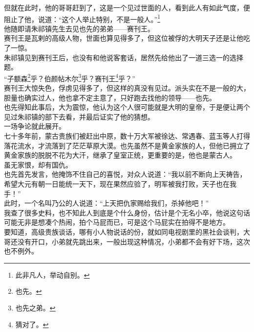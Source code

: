 \begin{multicols}{\theparacolNo}
但就在此时，他的哥哥赶到了，这是一个见过世面的人，看到此人有如此气度，便阻止了他，说道：“这个人举止特别，不是一般人。”\footnote{此非凡人，举动自别。}\\

他随即请朱祁镇先生去见也先的弟弟——赛刊王。\\

赛刊王是瓦剌的高级人物，世面也算见得多了，但这位被俘的大明天子还是让他吃了一惊。\\

朱祁镇见到赛刊王后，也没有和他说客套话，居然先给他出了一道三选一的选择题。\\

“子额森\footnote{也先。}乎？伯颜帖木尔\footnote{也先之弟。}乎？赛刊王\footnote{猜对了。}乎？”\\

赛刊王大惊失色，俘虏见得多了，但这样的真没有见过。派头实在不是一般的大，胆量也确实过人，他也拿不定主意了，只好跑去找他的领导——也先。\\

也先得知此事后，大为震惊，他认为这个人很可能就是大明的皇帝，于是便让两个见过朱祁镇的部下去看，并最后证实了他的猜想。\\

一场争论就此展开。\\

七十多年前，蒙古贵族们被赶出中原，数十万大军被徐达、常遇春、蓝玉等人打得落花流水，才流落到了茫茫草原大漠。也先虽然不是黄金家族的人，但他已拥立了黄金家族的脱脱不花为大汗，继承了皇室正统，更重要的是，他也是蒙古人。\\

虽无家恨，却有国仇。\\

也先首先发言，他掩饰不住自己的喜悦，对众人说道：“我以前不断向上天祷告，希望大元有朝一日能统一天下，现在果然应验了，明军被我打败，天子也在我手！”\\

此时，一个名叫乃公的人说道：“上天把仇家赐给我们，杀掉他吧！”\\

我查了很多史料，也不知此人到底是个什么身份，估计是个无名小卒，他说这句话可能无非是想凑个热闹，拍个马屁而已，可是这个马屁实在拍得不是地方。\\

要知道，高级贵族谈话，哪有小人物说话的份，就如同电视剧里的黑社会谈判，大哥还没有开口，小弟就先跳出来，一般出现这种情况，小弟都不会有好下场，这次也不例外。\\


\end{multicols}
